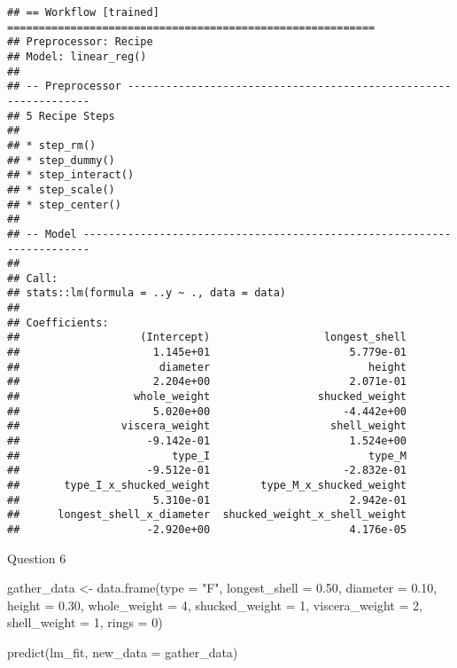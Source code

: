 \documentclass[
]{article}
\newenvironment{Shaded}{\begin{snugshade}}{\end{snugshade}}
\newcommand{\AttributeTok}[1]{\textcolor[rgb]{0.77,0.63,0.00}{#1}}
\newcommand{\DecValTok}[1]{\textcolor[rgb]{0.00,0.00,0.81}{#1}}
\newcommand{\FloatTok}[1]{\textcolor[rgb]{0.00,0.00,0.81}{#1}}
\newcommand{\FunctionTok}[1]{\textcolor[rgb]{0.00,0.00,0.00}{#1}}
\newcommand{\NormalTok}[1]{#1}
\newcommand{\OtherTok}[1]{\textcolor[rgb]{0.56,0.35,0.01}{#1}}
\newcommand{\StringTok}[1]{\textcolor[rgb]{0.31,0.60,0.02}{#1}}
\begin{document}
\begin{verbatim}
## == Workflow [trained] ==========================================================
## Preprocessor: Recipe
## Model: linear_reg()
## 
## -- Preprocessor ----------------------------------------------------------------
## 5 Recipe Steps
## 
## * step_rm()
## * step_dummy()
## * step_interact()
## * step_scale()
## * step_center()
## 
## -- Model -----------------------------------------------------------------------
## 
## Call:
## stats::lm(formula = ..y ~ ., data = data)
## 
## Coefficients:
##                   (Intercept)                  longest_shell  
##                     1.145e+01                      5.779e-01  
##                      diameter                         height  
##                     2.204e+00                      2.071e-01  
##                  whole_weight                 shucked_weight  
##                     5.020e+00                     -4.442e+00  
##                viscera_weight                   shell_weight  
##                    -9.142e-01                      1.524e+00  
##                        type_I                         type_M  
##                    -9.512e-01                     -2.832e-01  
##       type_I_x_shucked_weight        type_M_x_shucked_weight  
##                     5.310e-01                      2.942e-01  
##      longest_shell_x_diameter  shucked_weight_x_shell_weight  
##                    -2.920e+00                      4.176e-05
\end{verbatim}

Question 6

\begin{Shaded}
\begin{Highlighting}[]
\NormalTok{gather\_data }\OtherTok{\textless{}{-}} \FunctionTok{data.frame}\NormalTok{(}\AttributeTok{type =} \StringTok{"F"}\NormalTok{, }\AttributeTok{longest\_shell =} \FloatTok{0.50}\NormalTok{, }\AttributeTok{diameter =} \FloatTok{0.10}\NormalTok{, }
                          \AttributeTok{height =} \FloatTok{0.30}\NormalTok{, }\AttributeTok{whole\_weight =} \DecValTok{4}\NormalTok{, }\AttributeTok{shucked\_weight =} \DecValTok{1}\NormalTok{, }
                          \AttributeTok{viscera\_weight =} \DecValTok{2}\NormalTok{, }\AttributeTok{shell\_weight =} \DecValTok{1}\NormalTok{, }\AttributeTok{rings =} \DecValTok{0}\NormalTok{)}

\FunctionTok{predict}\NormalTok{(lm\_fit, }\AttributeTok{new\_data =}\NormalTok{ gather\_data)}
\end{Highlighting}
\end{Shaded}
\end{document}
